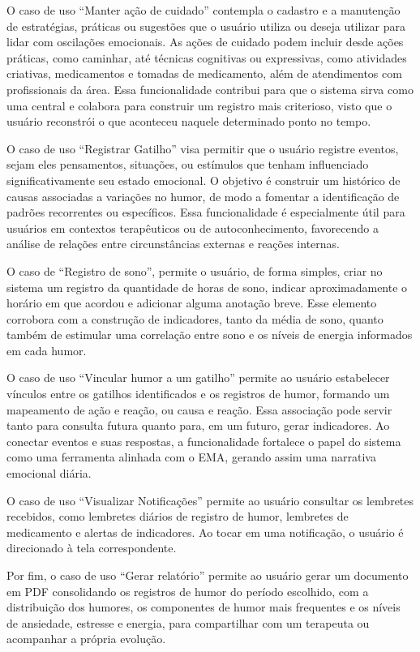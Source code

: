 O caso de uso ``Manter ação de cuidado'' contempla o cadastro e a manutenção de
estratégias, práticas ou sugestões que o usuário utiliza ou deseja utilizar
para lidar com oscilações emocionais. As ações de cuidado podem incluir desde
ações práticas, como caminhar, até técnicas cognitivas ou expressivas, como
atividades criativas, medicamentos e tomadas de medicamento, além de
atendimentos com profissionais
da área. Essa funcionalidade contribui para que o sistema sirva como uma
central e colabora para construir um registro mais criterioso, visto que o
usuário reconstrói o que aconteceu naquele determinado ponto no tempo.

O caso de uso ``Registrar Gatilho'' visa permitir que o usuário registre
eventos, sejam eles pensamentos, situações, ou estímulos que tenham
influenciado significativamente seu estado emocional. O objetivo é construir um
histórico de causas associadas a variações no humor, de modo a fomentar a
identificação de padrões recorrentes ou específicos. Essa funcionalidade é
especialmente útil para usuários em contextos terapêuticos ou de
autoconhecimento, favorecendo a análise de relações entre circunstâncias
externas e reações internas.

O caso de ``Registro de sono'', permite o usuário, de forma simples, criar no
sistema um registro da quantidade de horas de sono, indicar aproximadamente o
horário em que acordou e adicionar alguma anotação breve. Esse elemento
corrobora com a construção de indicadores, tanto da média de sono, quanto também
de estimular uma correlação entre sono e os níveis de energia informados em cada
humor.

O caso de uso ``Vincular humor a um gatilho'' permite ao usuário
estabelecer vínculos entre os gatilhos identificados e os registros de humor,
formando um mapeamento de ação e reação, ou causa e reação. Essa associação
pode servir tanto para consulta futura quanto para, em um futuro, gerar
indicadores. Ao conectar eventos e suas respostas, a funcionalidade fortalece o
papel do sistema como uma ferramenta alinhada com o EMA, gerando assim uma
narrativa emocional diária.

O caso de uso ``Visualizar Notificações'' permite ao usuário consultar os
lembretes recebidos, como lembretes diários de registro de humor, lembretes de
medicamento e alertas de indicadores. Ao tocar em uma notificação, o usuário é
direcionado à tela correspondente.

Por fim, o caso de uso ``Gerar relatório'' permite ao usuário gerar um
documento em PDF consolidando os registros de humor do período escolhido, com a
distribuição dos humores, os componentes de humor mais frequentes e os níveis
de ansiedade, estresse e energia, para compartilhar com um terapeuta ou
acompanhar a própria evolução.

